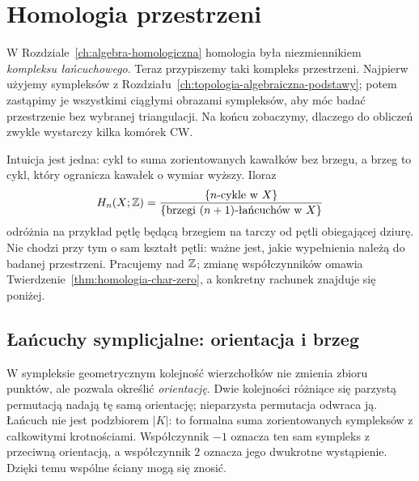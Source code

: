 \chapter{Homologia przestrzeni}
\label{ch:homologia-przestrzeni}

W Rozdziale~\ref{ch:algebra-homologiczna} homologia była
niezmiennikiem \emph{kompleksu łańcuchowego}.
Teraz przypiszemy taki kompleks przestrzeni. Najpierw
użyjemy sympleksów z Rozdziału~\ref{ch:topologia-algebraiczna-podstawy};
potem zastąpimy je wszystkimi ciągłymi obrazami sympleksów,
aby móc badać przestrzenie bez wybranej triangulacji. Na końcu
zobaczymy, dlaczego do obliczeń zwykle wystarczy
kilka komórek CW.

Intuicja jest jedna: cykl to suma zorientowanych kawałków
bez brzegu, a brzeg to cykl, który ogranicza kawałek
o wymiar wyższy. Iloraz
\[
 H_n(X;\mathbb{Z})=
 \frac{\{\text{$n$-cykle w $X$}\}}
 {\{\text{brzegi $(n+1)$-łańcuchów w $X$}\}}
\]
odróżnia na przykład pętlę będącą brzegiem na tarczy od pętli
obiegającej dziurę. Nie chodzi przy tym o sam kształt pętli:
ważne jest, jakie wypełnienia należą do badanej przestrzeni.
Pracujemy nad $\mathbb{Z}$; zmianę
współczynników omawia
Twierdzenie~\ref{thm:homologia-char-zero},
a konkretny rachunek znajduje się poniżej.

\section{Łańcuchy symplicjalne: orientacja i brzeg}
\label{sec:homologia-symplicjalna}

W sympleksie geometrycznym kolejność wierzchołków nie zmienia
zbioru punktów, ale pozwala określić \emph{orientację}.
Dwie kolejności różniące się parzystą permutacją nadają tę samą
orientację; nieparzysta permutacja odwraca ją. Łańcuch nie jest
podzbiorem $|K|$: to formalna suma zorientowanych sympleksów
z całkowitymi krotnościami. Współczynnik $-1$ oznacza ten sam
sympleks z przeciwną orientacją, a współczynnik $2$ oznacza jego
dwukrotne wystąpienie. Dzięki temu wspólne ściany mogą się znosić.

